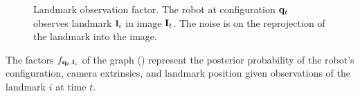 \begin{figure}
\centering
{} 
\caption{Landmark observation factor. The robot at configuration $\mathbf{q}_t$ observes landmark $\mathbf{l}_i$ in image $\mathbf{I}_t$. The noise is on the reprojection of the landmark into the image.}
\end{figure} 

The factors $f_{\mathbf{q}_t, \mathbf{l}_i}$ of the graph () represent the posterior probability of the robot's configuration, camera extrinsics, and landmark position given observations of the landmark $i$ at time $t$.

